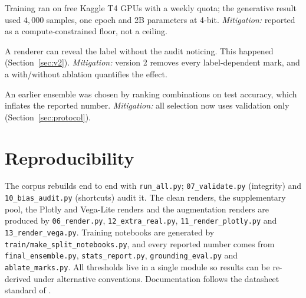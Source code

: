 \begin{description}[leftmargin=1.4cm,style=nextline,font=\bfseries]
  \item[R7. Compute constraints.] Training ran on free Kaggle T4 GPUs with a weekly
  quota; the generative result used $4{,}000$ samples, one epoch and 2B parameters at
  4-bit. \emph{Mitigation:} reported as a compute-constrained floor, not a ceiling.

  \item[R8. Rendering leaks.] A renderer can reveal the label without the audit
  noticing. This happened (Section~\ref{sec:v2}). \emph{Mitigation:} version 2 removes
  every label-dependent mark, and a with/without ablation quantifies the effect.

  \item[R9. Selection on the test set.] An earlier ensemble was chosen by ranking
  combinations on test accuracy, which inflates the reported number.
  \emph{Mitigation:} all selection now uses validation only (Section~\ref{sec:protocol}).
\end{description}

\section{Reproducibility}

The corpus rebuilds end to end with \texttt{run\_all.py}; \texttt{07\_validate.py}
(integrity) and \texttt{10\_bias\_audit.py} (shortcuts) audit it. The clean renders,
the supplementary pool, the Plotly and Vega-Lite renders and the augmentation renders
are produced by \texttt{06\_render.py}, \texttt{12\_extra\_real.py},
\texttt{11\_render\_plotly.py} and \texttt{13\_render\_vega.py}. Training notebooks are
generated by \texttt{train/make\_split\_notebooks.py}, and every reported number comes
from \texttt{final\_ensemble.py}, \texttt{stats\_report.py},
\texttt{grounding\_eval.py} and \texttt{ablate\_marks.py}. All thresholds live in a
single module so results can be re-derived under alternative conventions.
Documentation follows the datasheet standard of \citet{datasheets}.
